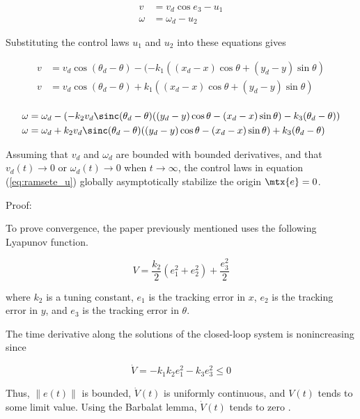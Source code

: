 \begin{align*}
  v &= v_d\cos e_3 - u_1 \\
  \omega &= \omega_d - u_2
\end{align*}

Substituting the control laws $u_1$ and $u_2$ into these equations gives

\begin{align*}
  v &= v_d\cos(\theta_d - \theta) -
    (-k_1 ((x_d - x) \cos\theta + (y_d - y) \sin\theta) \\
  v &= v_d\cos(\theta_d - \theta) +
    k_1 ((x_d - x) \cos\theta + (y_d - y) \sin\theta) \\
\end{align*}

\begin{align*}
  \omega &= \omega_d -
    \left(-k_2 v_d \sinc(\theta_d - \theta)
    ((y_d - y) \cos\theta - (x_d - x) \sin\theta) -
      k_3 (\theta_d - \theta)\right) \\
  \omega &= \omega_d + k_2 v_d \sinc(\theta_d - \theta)
    ((y_d - y) \cos\theta - (x_d - x) \sin\theta) + k_3 (\theta_d - \theta)
\end{align*}

\begin{theorem}
  Assuming that $v_d$ and $\omega_d$ are bounded with bounded derivatives, and
  that $v_d(t) \rightarrow 0$ or $\omega_d(t) \rightarrow 0$ when
  $t \rightarrow \infty$, the control laws in equation (\ref{eq:ramsete_u})
  globally asymptotically stabilize the origin $\mtx{e} = 0$.

  Proof:

  To prove convergence, the paper previously mentioned uses the following
  Lyapunov function.

  \begin{equation*}
    V = \frac{k_2}{2}(e_1^2 + e_2^2) + \frac{e_3^2}{2}
  \end{equation*}

  where $k_2$ is a tuning constant, $e_1$ is the tracking error in $x$, $e_2$ is
  the tracking error in $y$, and $e_3$ is the tracking error in $\theta$.

  The time derivative along the solutions of the closed-loop \gls{system} is
  nonincreasing since

  \begin{equation*}
    \dot{V} = -k_1 k_2 e_1^2 - k_3 e_3^2 \leq 0
  \end{equation*}

  Thus, $\lVert e(t) \rVert$ is bounded, $\dot{V}(t)$ is uniformly continuous,
  and $V(t)$ tends to some limit value. Using the Barbalat lemma, $\dot{V}(t)$
  tends to zero \cite{bib:ctrl_wheeled_mobile_robots}.
\end{theorem}

